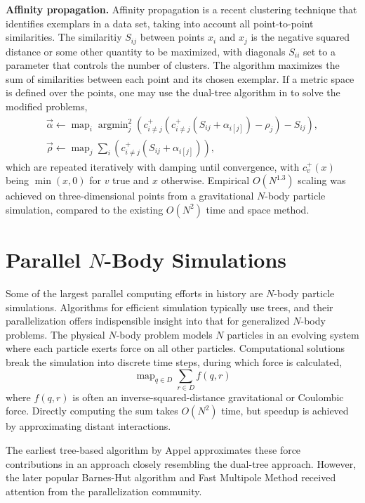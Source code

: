 \documentclass[times, leqno,twocolumn]{article}
\DeclareMathOperator*{\map}{map}
\DeclareMathOperator*{\argmin}{argmin}
\newcommand{\ocpos}[1]{c^{+}_{#1}}
\newcommand{\cpos}[2]{\ocpos{#1 \neq #2}}
\newcommand{\simil}[2]{S_{#1#2}}
\newcommand{\vecrho}{\vec{\rho}}
\newcommand{\vecalpha}{\vec{\alpha}}
\newcommand{\frho}[1]{\rho_{#1}}
\newcommand{\falphaj}[2]{\alpha_{#1[#2]}}
\begin{document}
{\bf Affinity propagation.}
Affinity propagation is a recent clustering technique that identifies exemplars in a data set, taking into account all point-to-point similarities\cite{frey_dueck}.
The similaritiy $\simil{i}{j}$ between points $x_i$ and $x_j$ is the negative squared distance or some other quantity to be maximized, with diagonals $\simil{i}{i}$ set to a parameter that controls the number of clusters.
The algorithm maximizes the sum of similarities between each point and its chosen exemplar.
If a metric space is defined over the points, one may use the dual-tree algorithm in \cite{ryan_nips} to solve the modified problems,
\[ \begin{array}{l}
  \vecalpha \gets \map_{i} \argmin^2_{j} \!\left( \cpos{i}{j}(\cpos{i}{j}(\simil{i}{j} + \falphaj{i}{j}) - \frho{j}) - \simil{i}{j} \right)\! ,
  \\
  \vecrho \gets \map_{j} \sum_{i} \!\left( \cpos{i}{j}(\simil{i}{j} + \falphaj{i}{j}) \right)\!,
\end{array} \]
\noindent which are repeated iteratively with damping until convergence, with $\ocpos{v}(x)$ being $\min(x, 0)$ for $v$ true and $x$ otherwise.
Empirical $O(N^{1.3})$ scaling was achieved on three-dimensional points from a gravitational $N$-body particle simulation, compared to the existing $O(N^2)$ time and space method.

\section{Parallel $N$-Body Simulations}

Some of the largest parallel computing efforts in history are $N$-body particle simulations.
Algorithms for efficient simulation typically use trees, and their parallelization offers indispensible insight into that for generalized $N$-body problems.
The physical $N$-body problem models $N$ particles in an evolving system where each particle exerts force on all other particles.
Computational solutions break the simulation into discrete time steps, during which force is calculated,
\[\map_{q \in D} \sum_{r \in D} f(q,r)\]
\noindent where $f(q,r)$ is often an inverse-squared-distance gravitational or Coulombic force.
Directly computing the sum takes $O(N^2)$ time, but speedup is achieved by approximating distant interactions.

The earliest tree-based algorithm by Appel \cite{appel} approximates these force contributions in an approach closely resembling the dual-tree approach.
However, the later popular Barnes-Hut algorithm\cite{barneshut} and Fast Multipole Method\cite{greengard_fmm} received attention from the parallelization community.
\end{document}
